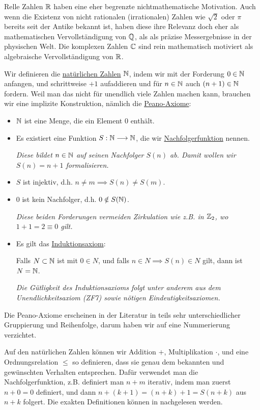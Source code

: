 Relle Zahlen $\mathbb{R}$ haben eine eher begrenzte nichtmathematische Motivation. Auch wenn die Existenz von nicht rationalen (irrationalen) Zahlen wie $\sqrt{2}$ oder $\pi$ bereits seit der Antike bekannt ist, haben diese ihre Relevanz doch eher als mathematischen Vervollständigung von $\mathbb{Q}$, als als präzise Messergebnisse in der physischen Welt. Die komplexen Zahlen $\mathbb{C}$ sind rein mathematisch motiviert als algebraische Vervollständigung von $\mathbb{R}$.

\begin{definition}
    \label{def-natural-numbers}
    Wir definieren die \underline{natürlichen Zahlen} $\mathbb{N}$, indem wir mit der Forderung $0 \in \mathbb{N}$ anfangen, und schrittweise $+1$ aufaddieren und für $n \in \mathbb{N}$ auch $(n+1) \in \mathbb{N}$ fordern. Weil man das nicht für unendlich viele Zahlen machen kann, brauchen wir eine implizite Konstruktion, nämlich die \underline{Peano-Axiome}:
    \begin{itemize}
        \item $\mathbb{N}$ ist eine Menge, die ein Element $0$ enthält.
        \item Es existiert eine Funktion $S: \mathbb{N} \longrightarrow \mathbb{N}$, die wir \underline{Nachfolgerfunktion} nennen.
        
        \emph{Diese bildet $n \in \mathbb{N}$ auf seinen Nachfolger $S(n)$ ab. Damit wollen wir $S(n) = n+1$ formalisieren.}
        \item $S$ ist injektiv, d.h. $n \neq m \implies S(n) \neq S(m)$.
        \item $0$ ist kein Nachfolger, d.h. $0 \notin S(\mathbb{N})$.
        
        \emph{Diese beiden Forderungen vermeiden Zirkulation wie z.B. in $\mathbb{Z}_2$, wo $1 + 1 = 2 \equiv 0$ gilt.}
        \item Es gilt das \underline{Induktionsaxiom}:

        Falls $N \subset \mathbb{N}$ ist mit $0 \in N$, und falls $n \in N \implies S(n) \in N$ gilt, dann ist $N = \mathbb{N}$.

        \emph{Die Gütligkeit des Induktionsaxioms folgt unter anderem aus dem Unendlichkeitsaxiom (ZF7) sowie nötigen Eindeutigkeitsaxiomen.}
    \end{itemize}
    Die Peano-Axiome erscheinen in der Literatur in teils sehr unterschiedlicher Gruppierung und Reihenfolge, darum haben wir auf eine Nummerierung verzichtet.

    Auf den natürlichen Zahlen können wir Addition $+$, Multiplikation $\cdot$, und eine Ordnungsrelation $\leq$ so definieren, dass sie genau dem bekannten und gewünschten Verhalten entsprechen. Dafür verwendet man die Nachfolgerfunktion, z.B. definiert man $n + m$ iterativ, indem man zuerst $n + 0 = 0$ definiert, und dann $n + (k + 1) = (n + k) + 1 = S(n + k)$ aus $n + k$ folgert. Die exakten Definitionen können in \cite{GURAU} nachgelesen werden.
\end{definition}

